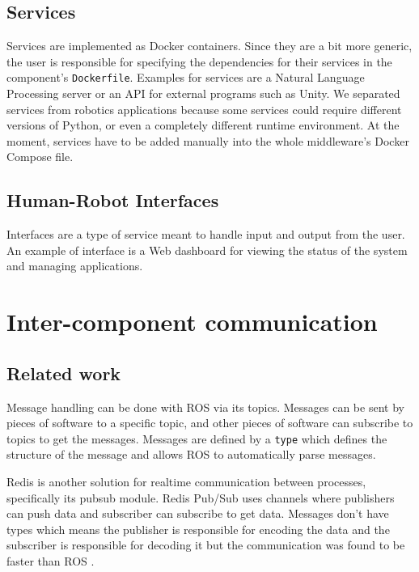 \subsection{Services}

Services are implemented as Docker containers. Since they are a bit more generic, the user is responsible for specifying the dependencies for their services in the component's \lstinline{Dockerfile}. Examples for services are a Natural Language Processing server or an API for external programs such as Unity. We separated services from robotics applications because some services could require different versions of Python, or even a completely different runtime environment. At the moment, services have to be added manually into the whole middleware's Docker Compose file.


\subsection{Human-Robot Interfaces}

Interfaces are a type of service meant to handle input and output from the user. An example of interface is a Web dashboard for viewing the status of the system and managing applications.



\section{Inter-component communication}


\subsection{Related work}

Message handling can be done with ROS via its topics. Messages can be sent by pieces of software to a specific topic, and other pieces of software can subscribe to topics to get the messages. Messages are defined by a \lstinline{type} which defines the structure of the message and allows ROS to automatically parse messages.

Redis is another solution for realtime communication between processes, specifically its \Gls{pubsub} module. Redis Pub/Sub uses channels where publishers can push data and subscriber can subscribe to get data. Messages don't have types which means the publisher is responsible for encoding the data and the subscriber is responsible for decoding it but the communication was found to be faster than ROS \cite{redis_benchmark}.

